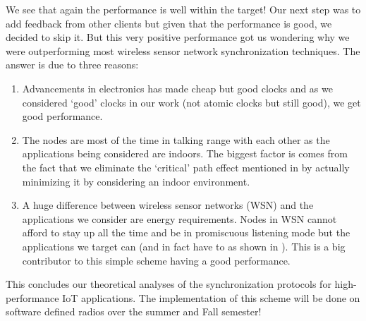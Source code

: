\documentclass[10pt, journal, letter, onecolumn]{IEEEtran}
\begin{document}
We see that again the performance is well within the target! Our next step was to add feedback from other clients but given that the performance is good, we decided to skip it. But this very positive performance got us wondering why we were outperforming most wireless sensor network synchronization techniques. The answer is due to three reasons:
\begin{enumerate}
\item Advancements in electronics has made cheap but good clocks and as we considered `good' clocks in our work (not atomic clocks but still good), we get good performance.
\item The nodes are most of the time in talking range with each other as the applications being considered are indoors. The biggest factor is comes from the fact that we eliminate the `critical' path effect mentioned in \cite{elson2002fine} by actually minimizing it by considering an indoor environment.
\item A huge difference between wireless sensor networks (WSN) and the applications we consider are energy requirements. Nodes in WSN cannot afford to stay up all the time and be in promiscuous listening mode but the applications we target can (and in fact have to as shown in \cite{swamy2015cooperative}). This is a big contributor to this simple scheme having a good performance.
\end{enumerate}

This concludes our theoretical analyses of the synchronization protocols for high-performance IoT applications. The implementation of this scheme will be done on software defined radios over the summer and Fall semester!



\end{document}
